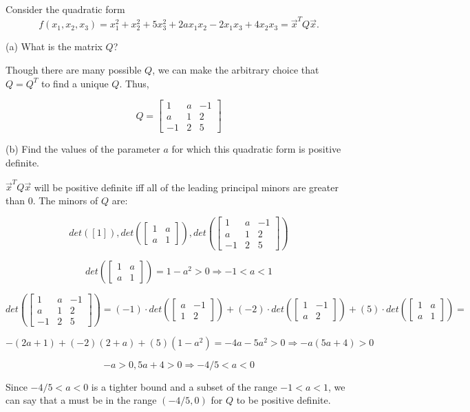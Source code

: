 \documentclass[12pt]{extarticle}
\theoremstyle{definition}
\begin{document}
\begin{problem}
Consider the quadratic form 
$$f(x_1,x_2,x_3)=x_1^2+x_2^2+5x_3^2+2ax_1x_2-2x_1x_3+4x_2x_3=\vec{x}^TQ\vec{x}.$$

	\begin{description}
		\item{(a)} What is the matrix $Q$?

		Though there are many possible $Q$, we can make the arbitrary choice that $Q=Q^T$ to find a unique $Q$. Thus,

		$$Q=\begin{bmatrix} 1 & a & -1\\ a & 1 & 2\\ -1 & 2 & 5\end{bmatrix}$$

		\item{(b)} Find the values of the parameter $a$ for which this quadratic form is positive definite.

		$\vec{x}^TQ\vec{x}$ will be positive definite iff all of the leading principal minors are greater than 0. The minors of $Q$ are:

		$$det([1]), det(\begin{bmatrix} 1 & a\\ a & 1 \end{bmatrix}), 
		det(\begin{bmatrix} 1 & a & -1\\ a & 1 & 2\\ -1 & 2 & 5\end{bmatrix})$$

		$$det(\begin{bmatrix} 1 & a\\ a & 1 \end{bmatrix})=1-a^2 > 0 \Longrightarrow -1 < a < 1$$

		$$det(\begin{bmatrix} 1 & a & -1\\ a & 1 & 2\\ -1 & 2 & 5\end{bmatrix}) = 
		(-1)\cdot det(\begin{bmatrix} a & -1\\ 1 & 2\end{bmatrix}) + 
		(-2)\cdot det(\begin{bmatrix} 1 & -1\\ a & 2\end{bmatrix}) + 
		(5)\cdot det(\begin{bmatrix} 1 & a\\ a & 1\end{bmatrix}) = $$

		$$-(2a+1)+(-2)(2+a)+(5)(1-a^2) = -4a - 5a^2 > 0 \Longrightarrow -a(5a+4) > 0 $$
		
		$$-a > 0, 5a+4 > 0 \Longrightarrow -4/5 < a < 0$$

		Since $-4/5 < a < 0$ is a tighter bound and a subset of the range $-1 < a < 1$, 
		we can say that a must be in the range $(-4/5,0)$ for $Q$ to be positive definite.

	\end{description}
\end{problem}
\end{document}
